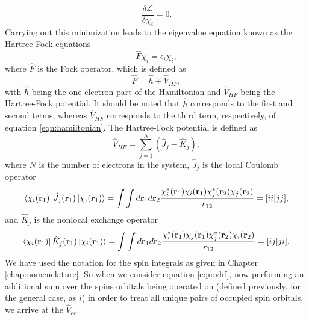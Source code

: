 \documentclass[12pt]{caltech_thesis}
\begin{document}
\begin{equation}
    \frac{\delta \mathcal{L}}{\delta \chi _i} = 0.
\end{equation}
Carrying out this minimization leads to the eigenvalue equation known as the Hartree-Fock equations
\begin{equation}
    \hat{F}\chi _i = \epsilon _i \chi _i,
\end{equation}
where $\hat{F}$ is the Fock operator, which is defined as
\begin{equation}
    \hat{F} = \hat{h} + \hat{V}_{HF},
\end{equation}
with $\hat{h}$ being the one-electron part of the Hamiltonian and $\hat{V}_{HF}$ being the Hartree-Fock potential. It should be noted that $\hat{h}$ corresponds to the first and second terms, whereas $\hat{V}_{HF}$ corresponds to the third term, respectively, of equation \ref{eqn:hamiltonian}. The Hartree-Fock potential is defined as
\begin{equation}
    \hat{V}_{HF} = \sum_{j=1}^{N} \left( \hat{J}_j - \hat{K}_j \right),
\label{eqn:vhf}
\end{equation}
where $N$ is the number of electrons in the system, $\hat{J}_j$ is the local Coulomb operator
\begin{equation}
    \bra{\chi_i(\mathbf{r}_1)} \hat{J}_j(\mathbf{r}_1) \ket{\chi_i(\mathbf{r}_1)} = \int \int d\mathbf{r}_1 d\mathbf{r}_2 \frac{\chi_i^*(\mathbf{r}_1) \chi_i(\mathbf{r}_1) \chi_j^*(\mathbf{r}_2) \chi_j(\mathbf{r}_2)}{r_{12}}=[ii|jj],
\end{equation}
 and $\hat{K}_j$ is the nonlocal exchange operator
\begin{equation}
    \bra{\chi_i(\mathbf{r}_1)} \hat{K}_j(\mathbf{r}_1) \ket{\chi_i(\mathbf{r}_1)} = \int \int d\mathbf{r}_1 d\mathbf{r}_2 \frac{\chi_i^*(\mathbf{r}_1) \chi_j(\mathbf{r}_1) \chi_j^*(\mathbf{r}_2) \chi_i(\mathbf{r}_2)}{r_{12}}=[ij|ji].
\end{equation}
We have used the notation for the spin integrals as given in Chapter \ref{chap:nomenclature}. So when we consider equation \ref{eqn:vhf}, now performing an additional sum over the spins orbitals being operated on (defined previously, for the general case, as $i$) in order to treat all unique pairs of occupied spin orbitals, we arrive at the $\hat{V}_{ee}$
\end{document}
